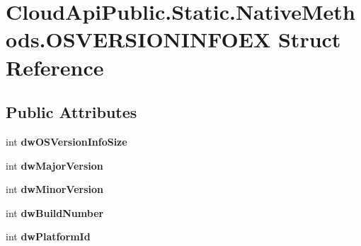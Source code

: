 \hypertarget{struct_cloud_api_public_1_1_static_1_1_native_methods_1_1_o_s_v_e_r_s_i_o_n_i_n_f_o_e_x}{\section{Cloud\-Api\-Public.\-Static.\-Native\-Methods.\-O\-S\-V\-E\-R\-S\-I\-O\-N\-I\-N\-F\-O\-E\-X Struct Reference}
\label{struct_cloud_api_public_1_1_static_1_1_native_methods_1_1_o_s_v_e_r_s_i_o_n_i_n_f_o_e_x}
}
\subsection*{Public Attributes}
\begin{DoxyCompactItemize}
\item 
\hypertarget{struct_cloud_api_public_1_1_static_1_1_native_methods_1_1_o_s_v_e_r_s_i_o_n_i_n_f_o_e_x_a901b3171c732e567ed4e648c8247c52e}{int {\bfseries dw\-O\-S\-Version\-Info\-Size}}\label{struct_cloud_api_public_1_1_static_1_1_native_methods_1_1_o_s_v_e_r_s_i_o_n_i_n_f_o_e_x_a901b3171c732e567ed4e648c8247c52e}

\item 
\hypertarget{struct_cloud_api_public_1_1_static_1_1_native_methods_1_1_o_s_v_e_r_s_i_o_n_i_n_f_o_e_x_a743052a995702f0ef15ca7405eb861c6}{int {\bfseries dw\-Major\-Version}}\label{struct_cloud_api_public_1_1_static_1_1_native_methods_1_1_o_s_v_e_r_s_i_o_n_i_n_f_o_e_x_a743052a995702f0ef15ca7405eb861c6}

\item 
\hypertarget{struct_cloud_api_public_1_1_static_1_1_native_methods_1_1_o_s_v_e_r_s_i_o_n_i_n_f_o_e_x_a7c3c576d9113b39ca42f79bb9babc48c}{int {\bfseries dw\-Minor\-Version}}\label{struct_cloud_api_public_1_1_static_1_1_native_methods_1_1_o_s_v_e_r_s_i_o_n_i_n_f_o_e_x_a7c3c576d9113b39ca42f79bb9babc48c}

\item 
\hypertarget{struct_cloud_api_public_1_1_static_1_1_native_methods_1_1_o_s_v_e_r_s_i_o_n_i_n_f_o_e_x_ab6c06cc2f4645487e1baa5c29d96dd89}{int {\bfseries dw\-Build\-Number}}\label{struct_cloud_api_public_1_1_static_1_1_native_methods_1_1_o_s_v_e_r_s_i_o_n_i_n_f_o_e_x_ab6c06cc2f4645487e1baa5c29d96dd89}

\item 
\hypertarget{struct_cloud_api_public_1_1_static_1_1_native_methods_1_1_o_s_v_e_r_s_i_o_n_i_n_f_o_e_x_a8d2d4172f1b39e28530506f8312c056f}{int {\bfseries dw\-Platform\-Id}}\label{struct_cloud_api_public_1_1_static_1_1_native_methods_1_1_o_s_v_e_r_s_i_o_n_i_n_f_o_e_x_a8d2d4172f1b39e28530506f8312c056f}


\end{DoxyCompactItemize}
